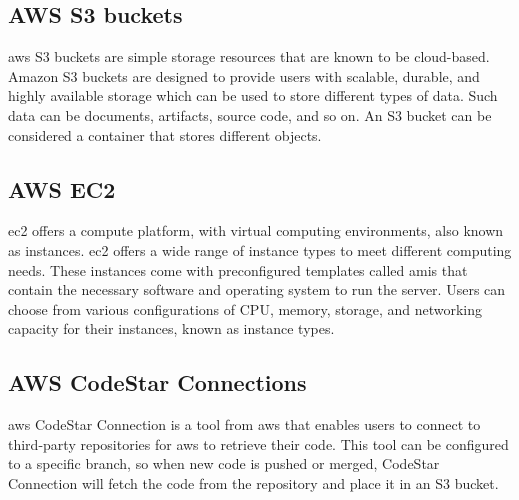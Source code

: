 \subsection{AWS S3 buckets}
\acrshort{aws} S3 buckets are simple storage resources that are known to be cloud-based. Amazon S3 buckets are designed to provide users with scalable, durable, and highly available storage which can be used to store different types of data. Such data can be documents, artifacts, source code, and so on. An S3 bucket can be considered a container that stores different objects. \cite{S3Bucket}

\subsection{AWS EC2}
\acrlong{ec2} offers a \gls{compute platform}, with virtual computing environments, also known as instances. \acrlong{ec2} offers a wide range of instance types to meet different computing needs. These instances come with preconfigured templates called \acrlong{amis} that contain the necessary software and operating system to run the server. Users can choose from various configurations of CPU, memory, storage, and networking capacity for their instances, known as instance types.\cite{awsec2}

\subsection{AWS CodeStar Connections}
\acrshort{aws} CodeStar Connection is a tool from \acrshort{aws} that enables users to connect to third-party repositories for \acrshort{aws} to retrieve their code. This tool can be configured to a specific branch, so when new code is pushed or merged, CodeStar Connection will fetch the code from the repository and place it in an S3 bucket.\cite{AWSCodeStarConnections}